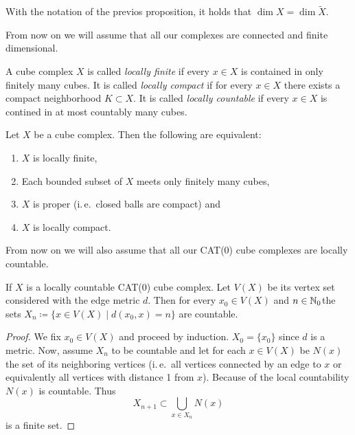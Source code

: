 
\begin{cor}
  With the notation of the previos proposition, it holds that \(\dim X = \dim \tilde X\).
\end{cor}

\begin{rem}
  From now on we will assume that all our complexes are connected and finite dimensional.
\end{rem}

\begin{defin}
  A cube complex \(X\) is called \emph{locally finite} if every \(x \in X\) is contained in only finitely many cubes. It is called \emph{locally compact} if for every \(x \in X\) there exists a compact neighborhood \(K \subset X\). It is called \emph{locally countable} if every \(x \in X\) is contined in at most countably many cubes.
\end{defin}

\begin{prop}
  Let \(X\) be a cube complex. Then the following are equivalent:
  \begin{enumerate}
  \item \(X\) is locally finite,
  \item Each bounded subset of \(X\) meets only finitely many cubes,
  \item \(X\) is proper (i.\,e.\ closed balls are compact) and
  \item \(X\) is locally compact.
  \end{enumerate}
\end{prop}

From now on we will also assume that all our CAT(0) cube complexes are locally countable.

\begin{lemma}
  \label{lem:lf-countable}
  If \(X\) is a locally countable CAT(0) cube complex. Let \(V(X)\) be its vertex set considered with the edge metric \(d\). Then for every \(x_0 \in V(X)\) and \(n \in \mathbb{N}_0\)the sets \(X_n \coloneqq \{x \in V(X) \mid d(x_0, x) = n\}\) are countable.
\end{lemma}

\begin{proof}
  We fix \(x_0 \in V(X)\) and proceed by induction. \(X_0 = \{x_0\}\) since \(d\) is a metric. Now, assume \(X_n\) to be countable and let for each \(x \in V(X)\) be \(N(x)\) the set of its neighboring vertices (i.\,e.\ all vertices connected by an edge to \(x\) or equivalently all vertices with distance 1 from \(x\)). Because of the local countability \(N(x)\) is countable. Thus
  \[
    X_{n+1} \subset \bigcup_{x \in X_n} N(x)
  \]
  is a finite set.
\end{proof}

